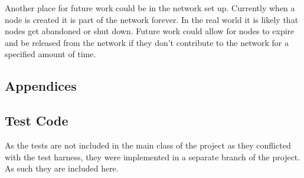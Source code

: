 \documentclass{l4proj}
\begin{document}
Another place for future work could be in the network set up. Currently when a node is created it is part of the
network forever. In the real world it is likely that nodes get abandoned or shut down. Future work could allow for 
nodes to expire and be released from the network if they don't contribute to the network for a specified amount of time.


\begin{appendices}

\chapter{Appendices}

\section{Test Code}
As the tests are not included in the main class of the project as they conflicted with the test harness, they were implemented
in a separate branch of the project. As such they are included here.

\begin{lstlisting}[language=java, float=h
    , label=lst:testCode]
    
\end{lstlisting}


\end{appendices}
\end{document}
